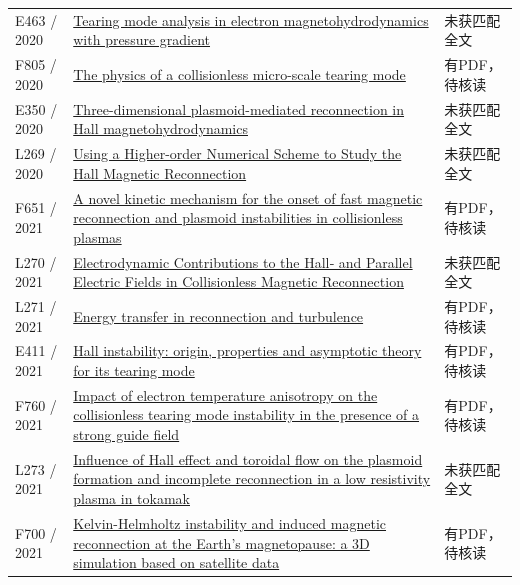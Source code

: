 \documentclass[UTF8,a4paper,11pt,openany,fontset=fandol]{ctexbook}
\begin{document}
\begin{longtable}{P{24mm}P{97mm}P{27mm}}
E463 / 2020 & \href{https://doi.org/10.1063/5.0022332}{Tearing mode analysis in electron magnetohydrodynamics with pressure gradient} & 未获匹配全文\\

F805 / 2020 & \href{https://etheses.whiterose.ac.uk/28202/1/Geng_PhD_Thesis.pdf}{The physics of a collisionless micro-scale tearing mode} & 有PDF，待核读\\

E350 / 2020 & \href{http://absimage.aps.org/image/DPP20/MWS_DPP20-2020-001547.pdf}{Three-dimensional plasmoid-mediated reconnection in Hall magnetohydrodynamics} & 未获匹配全文\\

L269 / 2020 & \href{https://doi.org/10.3847/1538-4357/ab7551}{Using a Higher-order Numerical Scheme to Study the Hall Magnetic Reconnection} & 未获匹配全文\\

F651 / 2021 & \href{https://doi.org/10.48550/arxiv.2112.03316}{A novel kinetic mechanism for the onset of fast magnetic reconnection and plasmoid instabilities in collisionless plasmas} & 有PDF，待核读\\

L270 / 2021 & \href{https://doi.org/10.1029/2021ja029550}{Electrodynamic Contributions to the Hall‐ and Parallel Electric Fields in Collisionless Magnetic Reconnection} & 未获匹配全文\\

L271 / 2021 & \href{https://doi.org/10.1103/physreve.104.065206}{Energy transfer in reconnection and turbulence} & 有PDF，待核读\\

E411 / 2021 & \href{https://doi.org/10.1017/s0022377821000726}{Hall instability: origin,  properties and asymptotic theory for its tearing mode} & 有PDF，待核读\\

F760 / 2021 & \href{https://doi.org/10.1063/5.0037227}{Impact of electron temperature anisotropy on the collisionless tearing mode instability in the presence of a strong guide field} & 有PDF，待核读\\

L273 / 2021 & \href{https://doi.org/10.1088/1741-4326/ac3365}{Influence of Hall effect and toroidal flow on the plasmoid formation and incomplete reconnection in a low resistivity plasma in tokamak} & 未获匹配全文\\

F700 / 2021 & \href{https://doi.org/10.1088/1361-6587/ac43f0}{Kelvin-Helmholtz instability and induced magnetic reconnection at the Earth’s magnetopause: a 3D simulation based on satellite data} & 有PDF，待核读\\


\end{longtable}
\end{document}

